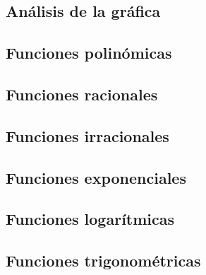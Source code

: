 \subsection{Análisis de la gráfica}


\subsection{Funciones polinómicas}


\subsection{Funciones racionales}


\subsection{Funciones irracionales}


\subsection{Funciones exponenciales}


\subsection{Funciones logarítmicas}


\subsection{Funciones trigonométricas}

